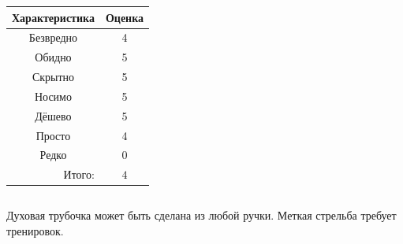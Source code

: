 \begin{frame}
\begin{columns}
            \begin{center}
                \begin{tabular}{c|c}
                    \hline\hline
                    Характеристика              & Оценка\\ \hline\hline
                    Безвредно                   & 4 \\
                    Обидно                      & 5 \\
                    Скрытно                     & 5 \\
                    Носимо                      & 5 \\
                    Дёшево                      & 5 \\
                    Просто                      & 4 \\ 
                    Редко                       & 0 \\ \hline
                    \multicolumn{1}{r|}{Итого:} & $4$ \\
                \end{tabular}
            \end{center}
    \end{columns}    
\end{frame}

Духовая трубочка может быть сделана из любой ручки. Меткая стрельба требует тренировок.


